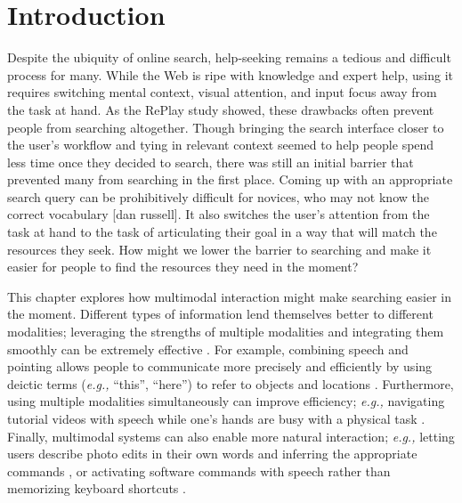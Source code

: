 \section{Introduction}
Despite the ubiquity of online search, help-seeking remains a tedious and difficult process for many. While the Web is ripe with knowledge and expert help, using it requires switching mental context, visual attention, and input focus away from the task at hand. As the RePlay study showed, these drawbacks often prevent people from searching altogether. Though bringing the search interface closer to the user's workflow and tying in relevant context seemed to help people spend less time once they decided to search, there was still an initial barrier that prevented many from searching in the first place. 
Coming up with an appropriate search query can be prohibitively difficult for novices, who may not know the correct vocabulary [dan russell]. It also switches the user's attention from the task at hand to the task of articulating their goal in a way that will match the resources they seek. How might we lower the barrier to searching and make it easier for people to find the resources they need in the moment?

This chapter explores how multimodal interaction might make searching easier in the moment. Different types of information lend themselves better to different modalities; leveraging the strengths of multiple modalities and integrating them smoothly can be extremely effective \cite{Oviatt1999}. For example, combining speech and pointing allows people to communicate more precisely and efficiently by using deictic terms (\textit{e.g.,} ``this'', ``here'') to refer to objects and locations \cite{Bolt1980, Linder2013}. Furthermore, using multiple modalities simultaneously can improve efficiency; \textit{e.g.,} navigating tutorial videos with speech while one's hands are busy with a physical task \cite{Chang2019}. Finally, multimodal systems can also enable more natural interaction; \textit{e.g.,} letting users describe photo edits in their own words and inferring the appropriate commands \cite{Linder2013}, or activating software commands with speech rather than memorizing keyboard shortcuts \cite{Kim2019}.

